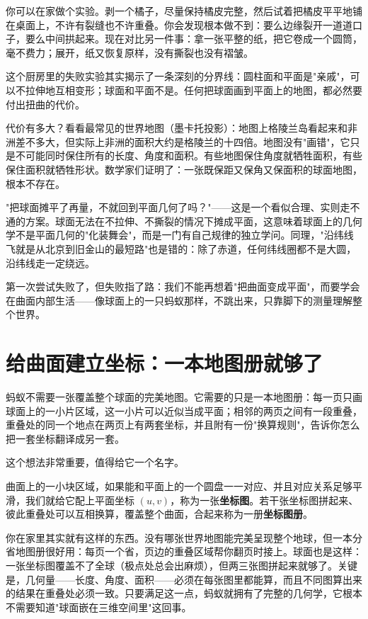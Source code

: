你可以在家做个实验。剥一个橘子，尽量保持橘皮完整，然后试着把橘皮平平地铺在桌面上，不许有裂缝也不许重叠。你会发现根本做不到：要么边缘裂开一道道口子，要么中间拱起来。现在对比另一件事：拿一张平整的纸，把它卷成一个圆筒，毫不费力；展开，纸又恢复原样，没有撕裂也没有褶皱。

这个厨房里的失败实验其实揭示了一条深刻的分界线：圆柱面和平面是"亲戚"，可以不拉伸地互相变形；球面和平面不是。任何把球面画到平面上的地图，都必然要付出扭曲的代价。

代价有多大？看看最常见的世界地图（墨卡托投影）：地图上格陵兰岛看起来和非洲差不多大，但实际上非洲的面积大约是格陵兰的十四倍。地图没有"画错"，它只是不可能同时保住所有的长度、角度和面积。有些地图保住角度就牺牲面积，有些保住面积就牺牲形状。数学家们证明了：一张既保距又保角又保面积的球面地图，根本不存在。

\begin{fanli}
"把球面摊平了再量，不就回到平面几何了吗？"——这是一个看似合理、实则走不通的方案。球面无法在不拉伸、不撕裂的情况下摊成平面，这意味着球面上的几何学不是平面几何的"化装舞会"，而是一门有自己规律的独立学问。同理，"沿纬线飞就是从北京到旧金山的最短路"也是错的：除了赤道，任何纬线圈都不是大圆，沿纬线走一定绕远。
\end{fanli}

第一次尝试失败了，但失败指了路：我们不能再想着"把曲面变成平面"，而要学会在曲面内部生活——像球面上的一只蚂蚁那样，不跳出来，只靠脚下的测量理解整个世界。

\section{给曲面建立坐标：一本地图册就够了}

蚂蚁不需要一张覆盖整个球面的完美地图。它需要的只是一本地图册：每一页只画球面上的一小片区域，这一小片可以近似当成平面；相邻的两页之间有一段重叠，重叠处的同一个地点在两页上有两套坐标，并且附有一份"换算规则"，告诉你怎么把一套坐标翻译成另一套。

这个想法非常重要，值得给它一个名字。

\begin{dingyi}
曲面上的一小块区域，如果能和平面上的一个圆盘一一对应、并且对应关系足够平滑，我们就给它配上平面坐标 $(u,v)$，称为一张\textbf{坐标图}。若干张坐标图拼起来、彼此重叠处可以互相换算，覆盖整个曲面，合起来称为一册\textbf{坐标图册}。
\end{dingyi}

你在家里其实就有这样的东西。没有哪张世界地图能完美呈现整个地球，但一本分省地图册很好用：每页一个省，页边的重叠区域帮你翻页时接上。球面也是这样：一张坐标图覆盖不了全球（极点处总会出麻烦），但两三张图拼起来就够了。关键是，几何量——长度、角度、面积——必须在每张图里都能算，而且不同图算出来的结果在重叠处必须一致。只要满足这一点，蚂蚁就拥有了完整的几何学，它根本不需要知道"球面嵌在三维空间里"这回事。

